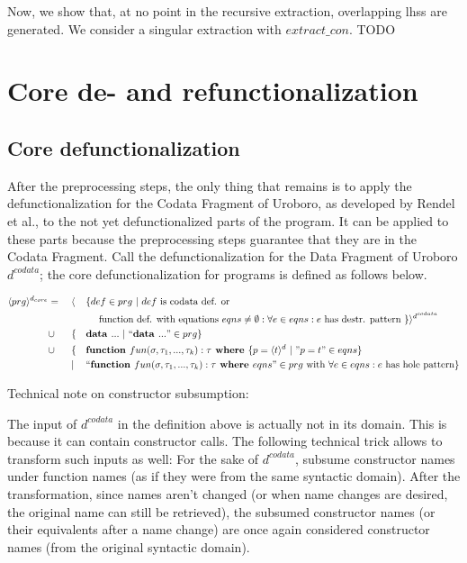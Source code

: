 Now, we show that, at no point in the recursive extraction, overlapping lhss are generated. We consider a singular extraction with $extract\_con$. TODO

\section{Core de- and refunctionalization}

\subsection{Core defunctionalization}

After the preprocessing steps, the only thing that remains is to apply the defunctionalization for the Codata Fragment of Uroboro, as developed by Rendel et al., to the not yet defunctionalized parts of the program. It can be applied to these parts because the preprocessing steps guarantee that they are in the Codata Fragment. Call the defunctionalization for the Data Fragment of Uroboro $d^{codata}$; the core defunctionalization for programs is defined as follows below.

\begin{alignat*}{3}
\langle prg \rangle^{d_{core}} & = ~&& \langle && \{ def \in prg ~ | ~ def \textrm{ is codata def. or} \\ & && &&\quad \textrm{ function def. with equations } eqns \neq \emptyset: \forall e \in eqns: e \textrm{ has destr. pattern } \} \rangle^{d^{codata}} \\
& \cup && \{ && \textrm{\textbf{data }} ... ~ | ~ `` \textrm{\textbf{data }} ... " \in prg \} \\
& \cup && \{ && \textrm{\textbf{function }} fun(\sigma, \tau_1, ..., \tau_k): \tau \textrm{\textbf{ where }} \{ p = \langle t \rangle^d ~ | ~ "p = t" \in eqns \} \\
& && | && `` \textrm{\textbf{function }} fun(\sigma, \tau_1, ..., \tau_k): \tau \textrm{\textbf{ where }} eqns " \in prg \textrm{ with } \forall e \in eqns: e \textrm{ has hole pattern}\} 
\end{alignat*}

Technical note on constructor subsumption:

The input of $d^{codata}$ in the definition above is actually not in its domain. This is because it can contain constructor calls. The following technical trick allows to transform such inputs as well: For the sake of $d^{codata}$, subsume constructor names under function names (as if they were from the same syntactic domain). After the transformation, since names aren't changed (or when name changes are desired, the original name can still be retrieved), the subsumed constructor names (or their equivalents after a name change) are once again considered constructor names (from the original syntactic domain).

